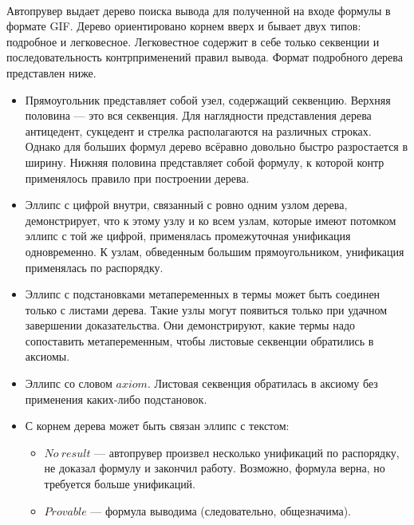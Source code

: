 \documentclass{cw1}
\begin{document}
\paragraph{}
Автопрувер выдает дерево поиска вывода для  полученной на входе формулы в формате GIF.
Дерево ориентировано корнем вверх и бывает двух типов: подробное и легковесное. Легковестное
содержит в себе только секвенции и последовательность контрприменений правил вывода.
Формат подробного дерева представлен ниже.
\begin{itemize}
 \item Прямоугольник представляет собой узел, содержащий секвенцию. Верхняя половина --- это
вся секвенция. Для наглядности представления дерева антицедент, сукцедент и стрелка располагаются
на различных строках. Однако для больших формул дерево всёравно довольно быстро разростается в ширину.
Нижняя половина представляет собой формулу, к которой контр применялось правило при построении дерева.
\item Эллипс с цифрой внутри, связанный с ровно одним узлом дерева, демонстрирует, что к этому узлу и ко
всем узлам, которые имеют потомком эллипс с той же цифрой, применялась промежуточная унификация
одновременно. К узлам, обведенным большим прямоугольником, унификация применялась по распорядку.
\item Эллипс с подстановками метапеременных в термы может быть соединен только с листами дерева.
Такие узлы могут появиться только при удачном завершении доказательства. Они демонстрируют, какие
термы надо сопоставить метапеременным, чтобы листовые секвенции обратились в аксиомы.
\item Эллипс со словом $axiom$. Листовая секвенция обратилась в аксиому без применения каких-либо подстановок.
\item С корнем дерева может быть связан эллипс с текстом:
  \begin{itemize}
   \item $N\!o\  result$ --- автопрувер произвел несколько унификаций по распорядку, не доказал формулу и закончил
            работу. Возможно, формула верна, но требуется больше унификаций.
   \item $Provable$ --- формула выводима (следовательно, общезначима).
  \end{itemize}
\end{itemize}
\end{document}
